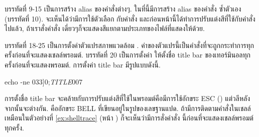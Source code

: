 \begin{thwbr}
บรรทัดที่ 9-15 เป็นการสร้าง alias ของคำสั่งต่างๆ. ในที่นี้มีการสร้าง alias ของคำสั่ง  ซ้ำตัวเอง (บรรทัดที่ 10). จะเห็นได้ว่ามีการใช้ตัวเลือก  กับคำสั่ง  และก่อนหน้านี้ได้ทำการปรับแต่งสีที่ใช้กับคำสั่ง  ไปแล้ว, ถ้าเราสั่งคำสั่ง  เดี่ยวๆก็จะแสดงสีแยกตามประเภทของไฟล์ที่แสดงให้ด้วย.

บรรทัดที่ 18-25 เป็นการตั้งค่าตัวแปรสภาพแวดล้อม . ค่าของตัวแปรนี้เป็นคำสั่งที่จะถูกกระทำการทุกครั้งก่อนที่จะแสดงเชลล์พรอมต์. บรรทัดที่ 20 เป็นการตั้งค่า  ให้ตั้งชื่อ title bar ของเทอร์มินอลทุกครั้งก่อนที่จะแสดงพรอมต์. การตั้งค่า title bar มีรูปแบบดังนี้.
\begin{MyVerbatim}
echo -ne \dq{}\bs{}033]0;\textit{TITLE}\bs{}007\dq{}
\end{MyVerbatim}

การตั้งชื่อ title bar จะคล้ายกับการปรับแต่งสีที่ใช้ในพรอมต์คือมีการใช้อักขระ ESC () แต่วลีหลังจากนั้นจะต่างกัน.  คืออักขระ BELL ที่เขียนอยู่ในรูปของเลขฐานแปด. ถ้ามีการติดตามคำสั่งในเชลล์เหมือนในตัวอย่างที่ \ref{ex:shelltrace} (หน้า \pageref{ex:shelltrace}) ก็จะเห็นว่ามีการสั่งคำสั่ง  นี้ก่อนที่จะแสดงเชลล์พรอมต์ทุกครั้ง.




\end{thwbr}
